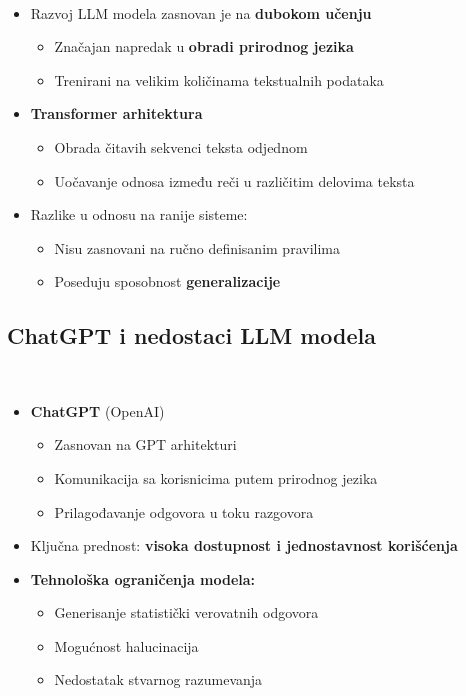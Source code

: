 \documentclass{beamer}
\newcommand{\frametitlesection}{
    \raggedright
    \insertsubsectionhead\\[-2pt]
    {\small \insertsectionhead}
}
\begin{document}
\begin{frame}{\frametitlesection}

\begin{itemize}
    \item Razvoj LLM modela zasnovan je na \textbf{dubokom učenju}
    \begin{itemize}
        \item Značajan napredak u \textbf{obradi prirodnog jezika}
        \item Trenirani na velikim količinama tekstualnih podataka
    \end{itemize}
    \item \textbf{Transformer arhitektura}
    \begin{itemize}
        \item Obrada čitavih sekvenci teksta odjednom
        \item Uočavanje odnosa između reči u različitim delovima teksta
    \end{itemize}
    \item Razlike u odnosu na ranije sisteme:
    \begin{itemize}
            \item Nisu zasnovani na ručno definisanim pravilima
            \item Poseduju sposobnost \textbf{generalizacije}
    \end{itemize}
\end{itemize}

\end{frame}

\subsection{ChatGPT i nedostaci LLM modela}

\begin{frame}{\frametitlesection}

\begin{itemize}
    \item \textbf{ChatGPT} (OpenAI)
    \begin{itemize}
        \item Zasnovan na GPT arhitekturi
        \item Komunikacija sa korisnicima putem prirodnog jezika
        \item Prilagođavanje odgovora u toku razgovora
    \end{itemize}
    \item Ključna prednost: \textbf{visoka dostupnost i jednostavnost korišćenja}
    \item \textbf{Tehnološka ograničenja modela:}
    \begin{itemize}
        \item Generisanje statistički verovatnih odgovora
        \item Mogućnost halucinacija
        \item Nedostatak stvarnog razumevanja 
\end{itemize}
\end{itemize}

\end{frame}
\end{document}
